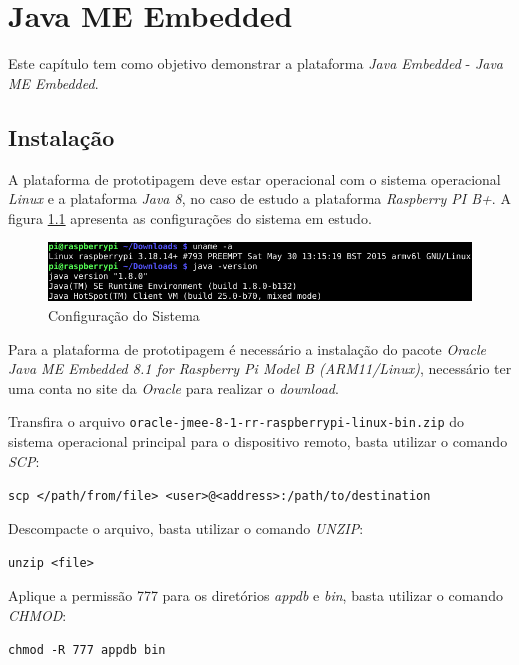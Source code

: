 %


\chapter{Java ME Embedded}

Este capítulo tem como objetivo demonstrar a plataforma \textit{Java Embedded} 
- \textit{Java ME Embedded}.

\section{Instalação}

A plataforma de prototipagem deve estar operacional com o sistema operacional 
\textit{Linux} e a plataforma \textit{Java 8}, no caso de estudo a plataforma 
\textit{Raspberry PI B+}. A figura \ref{fig:java-me/configuracao} apresenta as 
configurações do sistema em estudo.

\begin{figure}[H]
    \centering
    \includegraphics[width=0.7\linewidth]{figuras/java/configuracao}
    \caption{Configuração do Sistema}
    \label{fig:java-me/configuracao}
\end{figure}

Para a plataforma de prototipagem é necessário a instalação do pacote 
\textit{Oracle Java ME Embedded 8.1 for Raspberry Pi Model B (ARM11/Linux)}, 
necessário ter uma conta no site da \textit{Oracle} para realizar o 
\textit{download}.

Transfira o arquivo 
\verb|oracle-jmee-8-1-rr-raspberrypi-linux-bin.zip| do sistema operacional 
principal para o dispositivo remoto, basta utilizar o comando \textit{SCP}:

\verb|scp </path/from/file> <user>@<address>:/path/to/destination|

Descompacte o arquivo, basta utilizar o comando \textit{UNZIP}:

\verb|unzip <file>|

Aplique a permissão 777 para os diretórios \textit{appdb} e \textit{bin}, basta 
utilizar o comando \textit{CHMOD}:

\verb|chmod -R 777 appdb bin|

